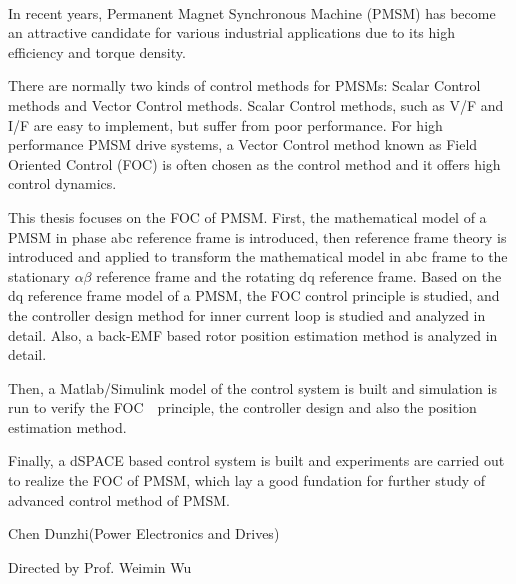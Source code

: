 \begin{abstractEn}\\
	In recent years, Permanent Magnet Synchronous Machine (PMSM) has become an attractive candidate for various industrial applications due to its high efficiency and torque density. 
	
	There are normally two kinds of control methods for PMSMs: Scalar Control methods and Vector Control methods. Scalar Control methods, such as V/F and I/F are easy to implement, but suffer from poor performance. For high performance PMSM drive systems, a Vector Control method known as Field Oriented Control (FOC) is often chosen as the control method and it offers high control dynamics. 
	
	This thesis focuses on the FOC of PMSM. First, the mathematical model of a PMSM in phase abc reference frame is introduced, then reference frame theory is introduced and applied to transform the mathematical model in abc frame to the stationary $\alpha\beta$ reference frame and the rotating dq reference frame. Based on the dq reference frame model of a PMSM, the FOC control principle is studied, and the controller design method for inner current loop is studied and analyzed in detail. Also, a back-EMF based rotor position estimation method is analyzed in detail.

	Then, a Matlab/Simulink model of the control system is built and simulation is run to verify the FOC　principle, the controller design  
	and also the position estimation method.
	
	Finally, a dSPACE based control system is built and experiments are carried out to realize the FOC of PMSM, which lay a good fundation for further study of advanced control method of PMSM.
	
	\begin{flushright}
		Chen Dunzhi(Power Electronics and Drives)
		
		Directed by Prof. Weimin Wu
    \par\end{flushright}
\end{abstractEn}\\
